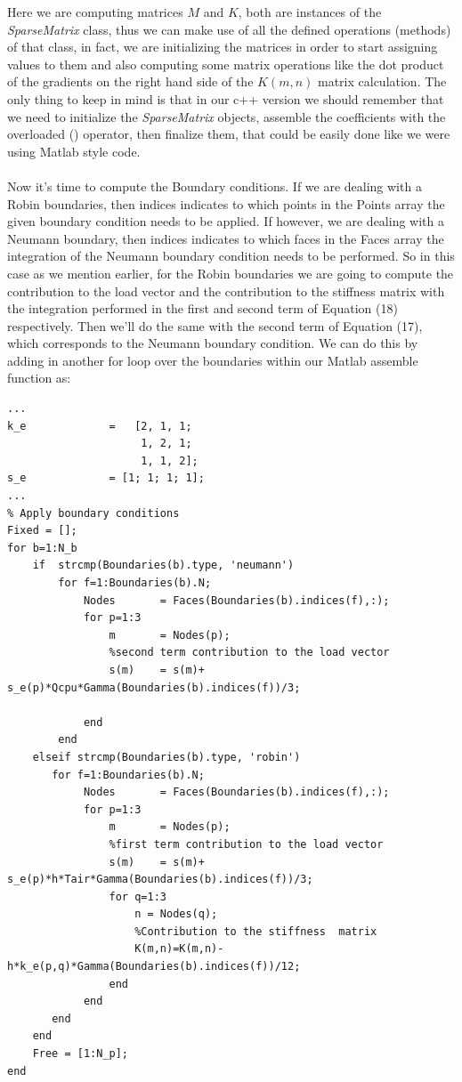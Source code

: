 \documentclass[12pt]{article}
\begin{document}
Here we are computing matrices $M$ and $K$, both are instances of the \textit{SparseMatrix} class, thus we can make use of all the defined operations (methods) of that class, in fact, we are initializing the matrices in order to start assigning values to them and also computing some matrix operations like the dot product of the gradients on the right hand side of the $K(m,n)$ matrix calculation. The only thing to keep in mind is that in our c++ version we should remember that we need to initialize the \textit{SparseMatrix} objects, assemble the coefficients with the overloaded () operator, then finalize them, that could be easily done like we were using Matlab style code.
\\\\
Now it's time to compute the Boundary conditions. If we are dealing with a Robin boundaries, then indices indicates to which points in the Points array the given boundary condition needs to be applied. If however, we are dealing with a Neumann boundary, then indices indicates to which faces in the Faces array the integration of the Neumann boundary condition needs to be performed. So in this case as we mention earlier, for the Robin boundaries we are going to compute the contribution to the load vector and the contribution to the stiffness matrix with the integration performed in the first and second term of Equation (18) respectively. Then we'll do the same with the second term of Equation (17), which corresponds to the Neumann boundary condition. We can do this by adding in another for loop over the boundaries within our Matlab assemble function as:

\begin{lstlisting}
...
k_e             =   [2, 1, 1; 
                     1, 2, 1;
                     1, 1, 2];                   
s_e             = [1; 1; 1; 1];
...
% Apply boundary conditions
Fixed = [];
for b=1:N_b  
	if  strcmp(Boundaries(b).type, 'neumann')
		for f=1:Boundaries(b).N;
			Nodes       = Faces(Boundaries(b).indices(f),:);
			for p=1:3
				m     	= Nodes(p);
				%second term contribution to the load vector
				s(m)	= s(m)+ s_e(p)*Qcpu*Gamma(Boundaries(b).indices(f))/3; 
				
			end
		end        
	elseif strcmp(Boundaries(b).type, 'robin')
	   for f=1:Boundaries(b).N;
			Nodes       = Faces(Boundaries(b).indices(f),:);
			for p=1:3
				m     	= Nodes(p);
				%first term contribution to the load vector
				s(m)	= s(m)+ s_e(p)*h*Tair*Gamma(Boundaries(b).indices(f))/3; 
				for q=1:3
					n = Nodes(q);
					%Contribution to the stiffness  matrix
					K(m,n)=K(m,n)-h*k_e(p,q)*Gamma(Boundaries(b).indices(f))/12; 
				end
			end
	   end
	end
	Free = [1:N_p];
end
\end{lstlisting}
\end{document}
